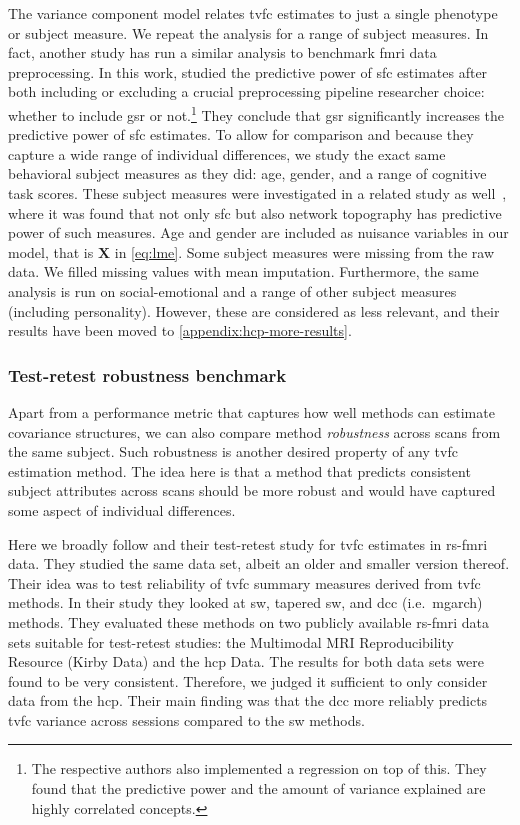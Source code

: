 The variance component model relates \gls{tvfc} estimates to just a single phenotype or subject measure.
We repeat the analysis for a range of subject measures.
%
In fact, another study has run a similar analysis to benchmark \gls{fmri} data preprocessing.
In this work, \textcite{Li2019a} studied the predictive power of \gls{sfc} estimates after both including or excluding a crucial preprocessing pipeline researcher choice: whether to include \gls{gsr} or not.\footnote{The respective authors also implemented a regression on top of this. They found that the predictive power and the amount of variance explained are highly correlated concepts.}
They conclude that \gls{gsr} significantly increases the predictive power of \gls{sfc} estimates.
To allow for comparison and because they capture a wide range of individual differences, we study the exact same behavioral subject measures as they did: age, gender, and a range of cognitive task scores.
These subject measures were investigated in a related study as well~\parencite{Kong2019}, where it was found that not only \gls{sfc} but also network topography has predictive power of such measures.
%
Age and gender are included as nuisance variables in our model, that is $\mathbf{X}$ in \cref{eq:lme}.
Some subject measures were missing from the raw data.
We filled missing values with mean imputation.
%
Furthermore, the same analysis is run on social-emotional and a range of other subject measures (including personality).
However, these are considered as less relevant, and their results have been moved to \cref{appendix:hcp-more-results}.

\subsubsection{Test-retest robustness benchmark}

Apart from a performance metric that captures how well methods can estimate covariance structures, we can also compare method \emph{robustness} across scans from the same subject.
Such robustness is another desired property of any \gls{tvfc} estimation method.
The idea here is that a method that predicts consistent subject attributes across scans should be more robust and would have captured some aspect of individual differences.

Here we broadly follow \textcite{Choe2017} and their test-retest study for \gls{tvfc} estimates in \gls{rs-fmri} data.
They studied the same data set, albeit an older and smaller version thereof.
%
Their idea was to test reliability of \gls{tvfc} summary measures derived from \gls{tvfc} methods.
In their study they looked at \gls{sw}, tapered \gls{sw}, and \gls{dcc} (i.e.~\gls{mgarch}) methods.
They evaluated these methods on two publicly available \gls{rs-fmri} data sets suitable for test-retest studies: the Multimodal MRI Reproducibility Resource (Kirby Data) and the \gls{hcp} Data.
The results for both data sets were found to be very consistent.
Therefore, we judged it sufficient to only consider data from the \gls{hcp}.
Their main finding was that the \gls{dcc} more reliably predicts \gls{tvfc} variance across sessions compared to the \gls{sw} methods.


